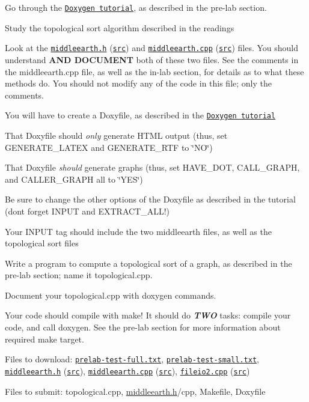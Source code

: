 \begin{DoxyEnumerate}
\item Go through the \href{../../tutorials/11-doxygen/index.html}{\tt Doxygen tutorial}, as described in the pre-\/lab section.
\item Study the topological sort algorithm described in the readings
\item Look at the \href{middleearth.h.html}{\tt middleearth.\+h} (\href{middleearth.h}{\tt src}) and \href{middleearth.cpp.html}{\tt middleearth.\+cpp} (\href{middleearth.cpp}{\tt src}) files. You should understand {\bfseries A\+ND D\+O\+C\+U\+M\+E\+NT} both of these two files. See the comments in the middleearth.\+cpp file, as well as the in-\/lab section, for details as to what these methods do. You should not modify any of the code in this file; only the comments.
\begin{DoxyItemize}
\item You will have to create a Doxyfile, as described in the \href{../../tutorials/11-doxygen/index.html}{\tt Doxygen tutorial}
\item That Doxyfile should {\itshape only} generate H\+T\+ML output (thus, set {\ttfamily G\+E\+N\+E\+R\+A\+T\+E\+\_\+\+L\+A\+T\+EX} and {\ttfamily G\+E\+N\+E\+R\+A\+T\+E\+\_\+\+R\+TF} to \char`\"{}\+N\+O\char`\"{})
\item That Doxyfile {\itshape should} generate graphs (thus, set {\ttfamily H\+A\+V\+E\+\_\+\+D\+OT}, {\ttfamily C\+A\+L\+L\+\_\+\+G\+R\+A\+PH}, and {\ttfamily C\+A\+L\+L\+E\+R\+\_\+\+G\+R\+A\+PH} all to \char`\"{}\+Y\+E\+S\char`\"{})
\item Be sure to change the other options of the Doxyfile as described in the tutorial (don\textquotesingle{}t forget {\ttfamily I\+N\+P\+UT} and {\ttfamily E\+X\+T\+R\+A\+C\+T\+\_\+\+A\+LL}!)
\item Your {\ttfamily I\+N\+P\+UT} tag should include the two middleearth files, as well as the topological sort files
\end{DoxyItemize}
\item Write a program to compute a topological sort of a graph, as described in the pre-\/lab section; name it {\ttfamily topological.\+cpp}.
\item Document your topological.\+cpp with doxygen commands.
\item Your code should compile with {\ttfamily make}! It should do {\itshape {\bfseries T\+WO}} tasks\+: compile your code, and call {\ttfamily doxygen}. See the pre-\/lab section for more information about required make target.
\item Files to download\+: \href{prelab-test-full.txt}{\tt prelab-\/test-\/full.\+txt}, \href{prelab-test-small.txt}{\tt prelab-\/test-\/small.\+txt}, \href{middleearth.h.html}{\tt middleearth.\+h} (\href{middleearth.h}{\tt src}), \href{middleearth.cpp.html}{\tt middleearth.\+cpp} (\href{middleearth.cpp}{\tt src}), \href{fileio2.cpp.html}{\tt fileio2.\+cpp} (\href{fileio2.cpp}{\tt src})
\item Files to submit\+: topological.\+cpp, \hyperlink{middleearth_8h_source}{middleearth.\+h}/cpp, Makefile, Doxyfile
\end{DoxyEnumerate}

